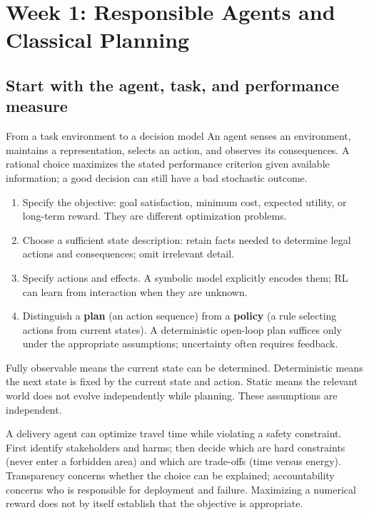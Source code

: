 \documentclass[10pt,a4paper]{article}
\newcommand{\topic}[1]{\clearpage\section{#1}}
\begin{document}
\topic{Week 1: Responsible Agents and Classical Planning}



\subsection{Start with the agent, task, and performance measure}
\begin{card}{From a task environment to a decision model}
An agent senses an environment, maintains a representation, selects an action, and observes its consequences. A rational choice maximizes the stated performance criterion given available information; a good decision can still have a bad stochastic outcome.
\begin{enumerate}
\item Specify the objective: goal satisfaction, minimum cost, expected utility, or long-term reward. They are different optimization problems.
\item Choose a sufficient state description: retain facts needed to determine legal actions and consequences; omit irrelevant detail.
\item Specify actions and effects. A symbolic model explicitly encodes them; RL can learn from interaction when they are unknown.
\item Distinguish a \textbf{plan} (an action sequence) from a \textbf{policy} (a rule selecting actions from current states). A deterministic open-loop plan suffices only under the appropriate assumptions; uncertainty often requires feedback.
\end{enumerate}
Fully observable means the current state can be determined. Deterministic means the next state is fixed by the current state and action. Static means the relevant world does not evolve independently while planning. These assumptions are independent.
\end{card}

\begin{idea}
A delivery agent can optimize travel time while violating a safety constraint. First identify stakeholders and harms; then decide which are hard constraints (never enter a forbidden area) and which are trade-offs (time versus energy). Transparency concerns whether the choice can be explained; accountability concerns who is responsible for deployment and failure. Maximizing a numerical reward does not by itself establish that the objective is appropriate.
\end{idea}
\end{document}
